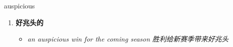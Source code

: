 
\begin{frame}
{\huge auspicious}
\begin{center}
\begin{enumerate}\Large
  \item \textbf{好兆头的}
  \begin{itemize}
    \item \em{\Large{an auspicious win for the coming season 胜利给新赛季带来好兆头}}
  \end{itemize}
\end{enumerate}
\end{center}
\end{frame}
